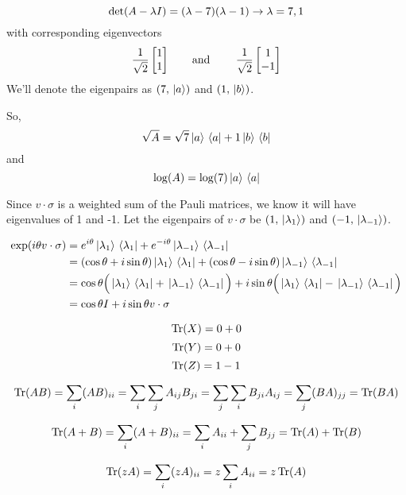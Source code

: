 $$\operatorname{det}(A - \lambda I) = (\lambda - 7)(\lambda - 1) \rightarrow \lambda = 7, 1$$
with corresponding eigenvectors 
$$\frac{1}{\sqrt{2}} \begin{bmatrix}
1 \\
1
\end{bmatrix} \text{\qquad and \qquad} \frac{1}{\sqrt{2}}	 \begin{bmatrix}
1 \\
-1
\end{bmatrix}$$
We'll denote the eigenpairs as $(7, \ket*{a})$ and $(1, \ket*{b})$.  

So, 
$$\sqrt{A} = \sqrt{7} \ket*{a} \bra*{a} + 1 \ket*{b} \bra*{b}$$
and 
$$\log (A) = \log (7) \ket*{a} \bra*{a}$$

\exercise
Since $v \cdot \sigma$ is a weighted sum of the Pauli matrices, we know it will have eigenvalues of 1 and -1. Let the eigenpairs of $v \cdot \sigma$ be $(1, \ket*{\lambda_{1}})$ and $(-1, \ket*{\lambda_{-1}})$. 

$$
\begin{aligned}
\exp (i \theta v \cdot \sigma) &= e^{i \theta} \ket*{\lambda_{1}} \bra*{\lambda_{1}} + e^{-i \theta} \ket*{\lambda_{-1}} \bra*{\lambda_{-1}} \\
&= (\cos \theta + i \sin \theta) \ket*{\lambda_{1}} \bra*{\lambda_{1}} + (\cos \theta - i \sin \theta) \ket*{\lambda_{-1}} \bra*{\lambda_{-1}} \\
&= \cos \theta \Big( \ket*{\lambda_{1}} \bra*{\lambda_{1}} + \ket*{\lambda_{-1}} \bra*{\lambda_{-1}} \Big) + i \sin \theta \Big(\ket*{\lambda_{1}} \bra*{\lambda_{1}} - \ket*{\lambda_{-1}} \bra*{\lambda_{-1}} \Big) \\
&= \cos \theta I + i \sin \theta v \cdot \sigma 
\end{aligned}
$$

\exercise
$$\Tr(X) = 0 + 0$$
$$\Tr(Y) = 0 + 0$$
$$\Tr(Z) = 1 - 1$$

\exercise
$$\Tr(AB) = \sum_{i} (AB)_{ii} = \sum_{i} \sum_{j} A_{ij} B_{ji} = \sum_{j} \sum_{i} B_{ji} A_{ij} = \sum_{j} (BA)_{jj} = \Tr(BA)$$

\exercise
$$\Tr(A+B) = \sum_{i} (A + B)_{ii} = \sum_{i} A_{ii} + \sum_{j} B_{jj} = \Tr(A) + \Tr(B)$$

$$\Tr(zA) = \sum_{i} (zA)_{ii} = z \sum_{i} A_{ii} = z \Tr(A)$$

